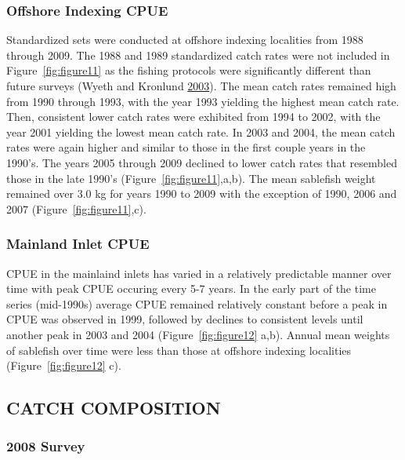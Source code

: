 \documentclass[12pt]{article}\usepackage[]{graphicx}\usepackage[]{color}
\begin{document}
\hypertarget{offshore-indexing-cpue}{%
\subsubsection{Offshore Indexing CPUE}\label{offshore-indexing-cpue}}

Standardized sets were conducted at offshore indexing localities from 1988 through 2009. The 1988 and 1989 standardized catch rates were not included in Figure~\ref{fig:figure11} as the fishing protocols were significantly different than future surveys (Wyeth and Kronlund \protect\hyperlink{ref-Wyeth2003}{2003}). The mean catch rates remained high from 1990 through 1993, with the year 1993 yielding the highest mean catch rate. Then, consistent lower catch rates were exhibited from 1994 to 2002, with the year 2001 yielding the lowest mean catch rate. In 2003 and 2004, the mean catch rates were again higher and similar to those in the first couple years in the 1990's. The years 2005 through 2009 declined to lower catch rates that resembled those in the late 1990's (Figure~\ref{fig:figure11},a,b). The mean sablefish weight remained over 3.0 kg for years 1990 to 2009 with the exception of 1990, 2006 and 2007 (Figure~\ref{fig:figure11},c).

\hypertarget{mainland-inlet-cpue}{%
\subsubsection{Mainland Inlet CPUE}\label{mainland-inlet-cpue}}

CPUE in the mainlaind inlets has varied in a relatively predictable manner over time with peak CPUE occuring every 5-7 years. In the early part of the time series (mid-1990s) average CPUE remained relatively constant before a peak in CPUE was observed in 1999, followed by declines to consistent levels until another peak in 2003 and 2004 (Figure~\ref{fig:figure12} a,b). Annual mean weights of sablefish over time were less than those at offshore indexing localities (Figure~\ref{fig:figure12} c).

\hypertarget{catch-composition}{%
\subsection{CATCH COMPOSITION}\label{catch-composition}}

\hypertarget{survey}{%
\subsubsection{2008 Survey}\label{survey}}
\end{document}
